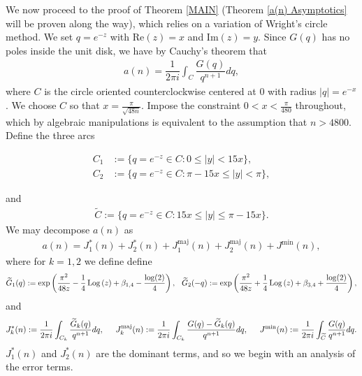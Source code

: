 \documentclass[11pt,reqno]{amsart}
\theoremstyle{definition}
\theoremstyle{plain}
\theoremstyle{named}
\DeclareMathOperator\Log{Log}
\numberwithin{equation}{section}
\theoremstyle{example}
\def\lp{\left(}
\def\rp{\right)}
\begin{document}
We now proceed to the proof of Theorem \ref{MAIN} (Theorem \ref{a(n) Asymptotics} will be proven along the way), which relies on a variation of Wright's circle method. We set $q = e^{-z}$ with $\mathrm{Re}\lp z \rp = x$ and $\mathrm{Im}\lp z \rp = y$. Since $G(q)$ has no poles inside the unit disk, we have by Cauchy's theorem that
\begin{align*}
    a(n) = \dfrac{1}{2\pi i} \int_C \dfrac{G(q)}{q^{n+1}} dq,
\end{align*}
where $C$ is the circle oriented counterclockwise centered at 0 with radius $|q| = e^{-x}$. We choose $C$ so that $x = \frac{\pi}{\sqrt{48n}}$. Impose the constraint $0 < x < \frac{\pi}{480}$ throughout, which by algebraic manipulations is equivalent to the assumption that $n > 4800$. Define the three arcs 
\begin{center}
\begin{align*}
	C_1 &:= \{ q = e^{-z} \in C : 0 \leq |y| < 15 x \}, \\ C_2 &:= \{ q = e^{-z} \in C : \pi - 15x \leq |y| < \pi \},
\end{align*}
\end{center}
and
\begin{align*}
	\widetilde{C} := \{ q = e^{-z} \in C : 15x \leq |y| \leq \pi - 15x \}.
\end{align*}
We may decompose $a(n)$ as
\begin{align*}
    a(n) =  J^*_1(n) + J^*_2(n) + J^{\text{maj}}_1(n) + J^{\text{maj}}_2(n) + J^{\text{min}}(n),
\end{align*}
where for $k = 1, 2$ we define
define
\begin{align*}
	\widetilde{G}_1(q) := \exp\lp \dfrac{\pi^2}{48z} - \dfrac{1}{4} \Log\lp z \rp + \beta_{1,4} - \dfrac{\log(2)}{4} \rp, \hspace{0.1in} \widetilde{G}_2(-q) := \exp\lp \dfrac{\pi^2}{48z} + \dfrac{1}{4} \Log\lp z \rp + \beta_{3,4} + \dfrac{\log(2)}{4} \rp,
\end{align*}
and
\begin{align*}
    J^*_k(n) := \dfrac{1}{2\pi i} \int_{C_k} \dfrac{\widetilde{G}_k(q)}{q^{n+1}} dq, \hspace{0.2in} J^{\text{maj}}_k(n) := \dfrac{1}{2\pi i} \int_{C_k} \dfrac{G(q) - \widetilde{G}_k(q)}{q^{n+1}} dq, \hspace{0.2in} J^{\text{min}}(n) := \dfrac{1}{2\pi i} \int_{\widetilde C} \dfrac{G(q)}{q^{n+1}} dq.
\end{align*}
$J_1^*(n)$ and $J_2^*(n)$ are the dominant terms, and so we begin with an analysis of the error terms.
\end{document}
